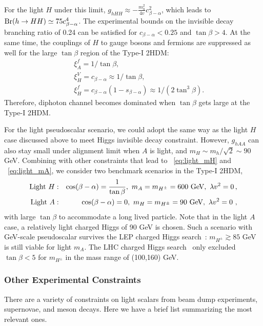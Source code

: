 \documentclass[letterpaper,11pt]{article}
\newcommand{\gev}{\text{~GeV}}
\newcommand{\tanb}{\tan \beta}
\def\cosba{\cos(\beta-\alpha)}
\def\mC{m_{H^\pm}}
\def\gev{\textrm{~GeV}}
\begin{document}
For the light $H$ under this limit, $g_{hHH}\approx -\frac{m_h^2}{4v} c_{\beta-\alpha}^2$, which leads to ${\rm Br}(h\to HH) \simeq 75 c_{\beta-\alpha}^4$. The experimental bounds on the invisible decay branching ratio of 0.24 can be satisfied for $c_{\beta-\alpha}<0.25$ and $\tan\beta>4$.  
% 
At the same time, the couplings of $H$ to gauge bosons and fermions are suppressed as well for the large $\tan\beta$ region of the Type-I 2HDM:  
\begin{eqnarray}
&& \xi_{A}^{f}=1/\tanb,
 \label{eq:light_Acoup}
\\
&&\xi_{H}^{V}=c_{\beta-\alpha}\approx 1/\tanb,\\
&&\xi_{H}^{f}=c_{\beta-\alpha}(1- s_{\beta-\alpha}) \approx 1/(2 \tan^3 \beta).
 \label{eq:light_Hcoup}
\end{eqnarray}
Therefore, diphoton channel becomes dominated when $\tanb$ gets large at the Type-I 2HDM.  

For the light pseudoscalar scenario, we could adopt the same way as the light $H$ case discussed above to meet Higgs invisible decay constraint. However,  $g_{hAA}$ can also stay small under alignment limit when $A$ is light, and $m_H\sim m_h/\sqrt{2}\sim 90$ GeV.
%  
Combining with other constraints that lead to ~\autoref{eq:light_mH} and ~\autoref{eq:light_mA}, we consider two benchmark scenarios in the Type-I 2HDM,
\begin{eqnarray}
    {\rm Light} ~H: &&\cosba=\frac{1}{\tan\beta}, \ m_A=\mC=600 \gev ,\ \lambda v^2=0 \, , 
    \label{eq:BM_H}\\
    {\rm Light} ~A: &&\cosba=0, \ m_H=m_{H^\pm}=90 \gev, \  \lambda v^2=0   \ ,
    \label{eq:BM_A}
\end{eqnarray}
with large $\tanb$ to accommodate a long lived particle.    Note that in the light $A$ case, a relatively light charged Higgs of 90 GeV is chosen.  Such a scenario with GeV-scale pseudoscalar survives the LEP charged Higgs search~\cite{ALEPH:2013htx}: $m_{H^\pm}\gtrsim 85$ GeV is still viable for light $m_A$.  The LHC charged Higgs search~\cite{ATLAS:2021xhq,ATLAS:2018gfm,CMS:2019bfg,CMS:2019idx,Cheung:2022ndq,Hu:2022gwd} only excluded $\tan\beta<5$ for $m_{H^\pm}$ in the mass range of (100,160) GeV.  
 





\subsubsection{Other Experimental Constraints}
\label{sec:constraints}
There are a variety of constraints on light scalars from beam dump experiments, supernovae, and meson decays.  Here we have a brief list summarizing the most relevant ones.  
\end{document}
